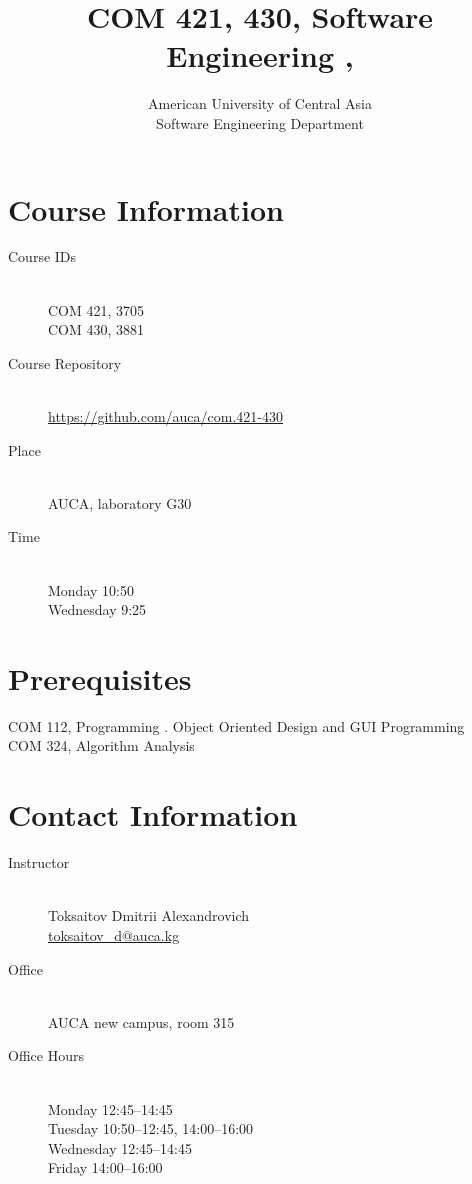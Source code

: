 \documentclass[12pt,a4paper,oneside]{article}
\newcommand{\R}[1]{\uppercase\expandafter{\romannumeral #1\relax}}
\begin{document}
    \title{COM 421, 430, Software Engineering \R{1}, \R{2}}
    \author{
        American University of Central Asia\\
        Software Engineering Department
    }
    \date{}
    \maketitle

    \section{Course Information}

        \begin{description}
            \item[Course IDs]\hfill\\
                COM 421, 3705\\
                COM 430, 3881
            \item[Course Repository]\hfill\\
                \url{https://github.com/auca/com.421-430}
            \item[Place]\hfill\\
                AUCA, laboratory G30
            \item[Time]\hfill\\
                Monday 10:50\\
                Wednesday 9:25
        \end{description}

    \section{Prerequisites}

        COM 112, Programming \R{2}. Object Oriented Design and GUI Programming\\
        COM 324, Algorithm Analysis

    \section{Contact Information}

        \begin{description}
            \item[Instructor]\hfill\\
                Toksaitov Dmitrii Alexandrovich\\
                \href{mailto:toksaitov_d@auca.kg}{toksaitov\_d@auca.kg}
            \item[Office]\hfill\\
                AUCA new campus, room 315
            \item[Office Hours]\hfill\\
                Monday 12:45--14:45\\
                Tuesday 10:50--12:45, 14:00--16:00\\
                Wednesday 12:45--14:45\\
                Friday 14:00--16:00
        \end{description}
\end{document}
